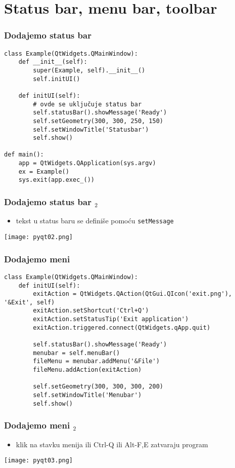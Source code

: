 \documentclass[utf8,compress,aspectratio=169]{beamer}
\begin{document}
\section[Bars]{Status bar, menu bar, toolbar}

\begin{frame}[fragile]
  \frametitle{Dodajemo status bar}
\begin{verbatim}
class Example(QtWidgets.QMainWindow):
    def __init__(self):
        super(Example, self).__init__()
        self.initUI()

    def initUI(self):
        # ovde se uključuje status bar
        self.statusBar().showMessage('Ready')
        self.setGeometry(300, 300, 250, 150)
        self.setWindowTitle('Statusbar')
        self.show()

def main():
    app = QtWidgets.QApplication(sys.argv)
    ex = Example()
    sys.exit(app.exec_())
\end{verbatim}
\end{frame}

\begin{frame}[fragile]
  \frametitle{Dodajemo status bar $_2$}
  \begin{itemize}
    \item tekst u status baru se definiše pomoću \texttt{setMessage}
  \end{itemize}
  \begin{center}
    \texttt{[image: pyqt02.png]}
  \end{center}
\end{frame}


\begin{frame}[fragile]
  \frametitle{Dodajemo meni}
\begin{verbatim}
class Example(QtWidgets.QMainWindow):
    def initUI(self):
        exitAction = QtWidgets.QAction(QtGui.QIcon('exit.png'), '&Exit', self)
        exitAction.setShortcut('Ctrl+Q')
        exitAction.setStatusTip('Exit application')
        exitAction.triggered.connect(QtWidgets.qApp.quit)

        self.statusBar().showMessage('Ready')
        menubar = self.menuBar()
        fileMenu = menubar.addMenu('&File')
        fileMenu.addAction(exitAction)

        self.setGeometry(300, 300, 300, 200)
        self.setWindowTitle('Menubar')
        self.show()
\end{verbatim}
\end{frame}

\begin{frame}[fragile]
  \frametitle{Dodajemo meni $_2$}
  \begin{itemize}
    \item klik na stavku menija ili Ctrl-Q ili Alt-F,E zatvaraju program
  \end{itemize}
  \begin{center}
    \texttt{[image: pyqt03.png]}
  \end{center}
\end{frame}
\end{document}
